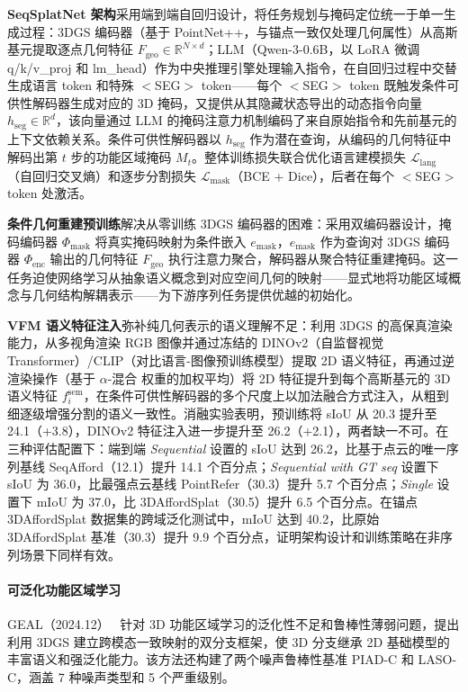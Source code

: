 \textbf{SeqSplatNet 架构}采用端到端自回归设计，将任务规划与掩码定位统一于单一生成过程：3DGS 编码器（基于 PointNet++，与锚点一致仅处理几何属性）从高斯基元提取逐点几何特征 $F_\text{geo} \in \mathbb{R}^{N \times d}$；LLM（Qwen-3-0.6B，以 LoRA 微调 q/k/v\_proj 和 lm\_head）作为中央推理引擎处理输入指令，在自回归过程中交替生成语言 token 和特殊 $<$SEG$>$ token——每个 $<$SEG$>$ token 既触发条件可供性解码器生成对应的 3D 掩码，又提供从其隐藏状态导出的动态指令向量 $h_\text{seg} \in \mathbb{R}^d$，该向量通过 LLM 的掩码注意力机制编码了来自原始指令和先前基元的上下文依赖关系。条件可供性解码器以 $h_\text{seg}$ 作为潜在查询，从编码的几何特征中解码出第 $t$ 步的功能区域掩码 $M_t$。整体训练损失联合优化语言建模损失 $\mathcal{L}_\text{lang}$（自回归交叉熵）和逐步分割损失 $\mathcal{L}_\text{mask}$（BCE + Dice），后者在每个 $<$SEG$>$ token 处激活。

\textbf{条件几何重建预训练}解决从零训练 3DGS 编码器的困难：采用双编码器设计，掩码编码器 $\Phi_\text{mask}$ 将真实掩码映射为条件嵌入 $e_\text{mask}$，$e_\text{mask}$ 作为查询对 3DGS 编码器 $\Phi_\text{enc}$ 输出的几何特征 $F_\text{geo}$ 执行注意力聚合，解码器从聚合特征重建掩码。这一任务迫使网络学习从抽象语义概念到对应空间几何的映射——显式地将功能区域概念与几何结构解耦表示——为下游序列任务提供优越的初始化。

\textbf{VFM 语义特征注入}弥补纯几何表示的语义理解不足：利用 3DGS 的高保真渲染能力，从多视角渲染 RGB 图像并通过冻结的 DINOv2（自监督视觉Transformer）/CLIP（对比语言-图像预训练模型）提取 2D 语义特征，再通过逆渲染操作（基于 $\alpha$-混合 权重的加权平均）将 2D 特征提升到每个高斯基元的 3D 语义特征 $f_i^\text{sem}$，在条件可供性解码器的多个尺度上以加法融合方式注入，从粗到细逐级增强分割的语义一致性。消融实验表明，预训练将 sIoU 从 20.3 提升至 24.1（+3.8），DINOv2 特征注入进一步提升至 26.2（+2.1），两者缺一不可。在三种评估配置下：端到端 \textit{Sequential} 设置的 sIoU 达到 26.2，比基于点云的唯一序列基线 SeqAfford（12.1）提升 14.1 个百分点；\textit{Sequential with GT seq} 设置下 sIoU 为 36.0，比最强点云基线 PointRefer（30.3）提升 5.7 个百分点；\textit{Single} 设置下 mIoU 为 37.0，比 3DAffordSplat（30.5）提升 6.5 个百分点。在锚点 3DAffordSplat 数据集的跨域泛化测试中，mIoU 达到 40.2，比原始 3DAffordSplat 基准（30.3）提升 9.9 个百分点，证明架构设计和训练策略在非序列场景下同样有效。

\paragraph{可泛化功能区域学习}

GEAL（2024.12）~\cite{2412_09511} 针对 3D 功能区域学习的泛化性不足和鲁棒性薄弱问题，提出利用 3DGS 建立跨模态一致映射的双分支框架，使 3D 分支继承 2D 基础模型的丰富语义和强泛化能力。该方法还构建了两个噪声鲁棒性基准 PIAD-C 和 LASO-C，涵盖 7 种噪声类型和 5 个严重级别。


